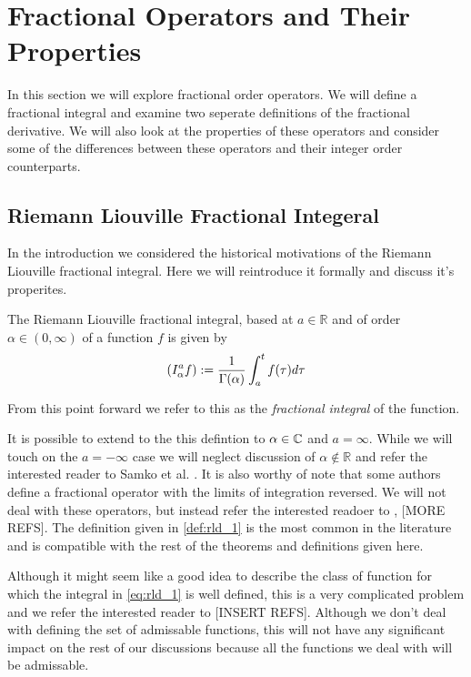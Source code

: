 \section{Fractional Operators and Their Properties}
In this section we will explore fractional order operators. We will define a fractional integral and examine two seperate definitions of the fractional derivative. We will also look at the properties of these operators and consider some of the differences between these operators and their integer order counterparts.

\subsection{Riemann Liouville Fractional Integeral}
In the introduction we considered the historical motivations of the Riemann Liouville fractional integral. Here we will reintroduce it formally and discuss it's properites.

\begin{definition}
\label{def:rld_1}
The Riemann Liouville fractional integral, based at $ a \in \mathbb{R} $ and of order $ \alpha \in (0, \infty) $ of a function $ f $ is given by
\begin{align}
    \label{eq:rld_1}
    \left( I_{\alpha}^{a} f \right) := \frac{1}{\Gamma(\alpha)} \int_a^t f(\tau) d\tau
\end{align}
\end{definition}
From this point forward we refer to this as the \emph{fractional integral} of the function.

It is possible to extend to the this defintion to $ \alpha \in \mathbb{C} $ and $ a = \infty $. While we will touch on the $ a = -\infty $ case we will neglect discussion of $ \alpha \not\in \mathbb{R} $ and refer the interested reader to Samko et al. \cite{Samko1993}.  It is also worthy of note that some authors define a fractional operator with the limits of integration reversed. We will not deal with these operators, but instead refer the interested readoer to \cite{Samko1993}, [MORE REFS]. The definition given in \ref{def:rld_1} is the most common in the literature and is compatible with the rest of the theorems and definitions given here.

Although it might seem like a good idea to describe the class of function for which the integral in \eqref{eq:rld_1} is well defined, this is a very complicated problem and we refer the interested reader to [INSERT REFS]. Although we don't deal with defining the set of admissable functions, this will not have any significant impact on the rest of our discussions because all the functions we deal with will be admissable. 

